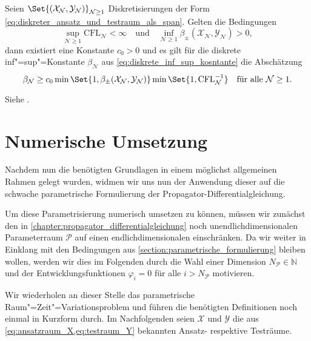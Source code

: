 \documentclass[../main.tex]{subfiles}
\begin{document}
\begin{Satz}
    Seien $\Set{(\mathcal X_{\mathcal N}, \mathcal Y_{\mathcal N})}_{\mathcal N \geq 1}$ Diskretisierungen der Form \cref{eq:diskreter_ansatz_und_testraum_als_span}.
    Gelten die Bedingungen
    \begin{equation}
        \sup_{\mathcal N \geq 1} \mathrm{CFL}_{\mathcal N} < \infty
        \quad \text{und} \quad
        \inf_{\mathcal N \geq 1} \beta_{\pm}(\mathcal X_{\mathcal N}, \mathcal Y_{\mathcal N}) > 0,
    \end{equation}
    dann existiert eine Konstante $c_{0} > 0$ und es gilt für die diskrete inf"=sup"=Konstante $\beta_{\mathcal N}$ aus \cref{eq:diskrete_inf_sup_kosntante} die Abschätzung
    \begin{equation}
        \beta_{\mathcal N} \geq c_{0} \min\Set{1, \beta_{\pm}(\mathcal X_{\mathcal N}, \mathcal Y_{\mathcal N})} \min\Set{1, \mathrm{CFL}_{\mathcal N}^{-1}} \quad \fa \mathcal N \geq 1.
    \end{equation}

    \begin{Beweis}
        Siehe \cite[Subsection 5.2.2]{Andreev:2012ep}.
    \end{Beweis}
\end{Satz}


\section{Numerische Umsetzung} %
\label{section:galerkin_numerische_umsetzung}

Nachdem nun die benötigten Grundlagen in einem möglichst allgemeinen Rahmen gelegt wurden, widmen wir uns nun der Anwendung dieser auf die schwache parametrische Formulierung der Propagator-Differentialgleichung.

Um diese Parametrisierung numerisch umsetzen zu können, müssen wir zunächst den in \cref{chapter:propagator_differentialgleichung} noch unendlichdimensionalen Parameterraum $\mathcal P$ auf einen endlichdimensionalen einschränken.
Da wir weiter in Einklang mit den Bedingungen aus \cref{section:parametrische_formulierung} bleiben wollen, werden wir dies im Folgenden durch die Wahl einer Dimension $N_{\mathcal P} \in \mathbb{N}$ und der Entwicklungsfunktionen $\varphi_{i} = 0$ für alle $i > N_{\mathcal P}$ motivieren.

Wir wiederholen an dieser Stelle das parametrische Raum"=Zeit"=Variationsproblem und führen die benötigten Definitionen noch einmal in Kurzform durch.
Im Nachfolgenden seien $\mathcal X$ und $\mathcal Y$ die aus \cref{eq:ansatzraum_X,eq:testraum_Y} bekannten Ansatz- respektive Testräume.
\end{document}
